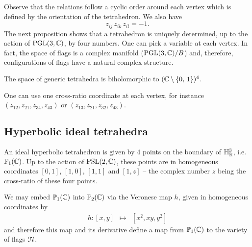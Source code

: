 Observe that the relations follow a cyclic order around each vertex which is defined by the orientation of the tetrahedron.
We also have
\begin{equation} \label{3-1}
z_{ij} \, z_{ik} \, z_{il} = -1.
\end{equation}
The next proposition shows that a tetrahedron is uniquely determined, up to the action of $\textrm{PGL}(3,\mathbb{C})$, by four numbers.
One can pick a variable at each vertex.  In fact, the space of flags  is a complex manifold ($\textrm{PGL}(3,\mathbb{C})/B$) and, therefore, configurations of flags have
a natural complex structure.
\begin{proposition}\cite{BFG}\label{parameters}
The space of generic tetrahedra is biholomorphic to $(\mathbb{C}\setminus \{0, \, 1\})^4$.
\end{proposition}

One can use one  cross-ratio coordinate at each vertex, for instance $(z_{12},z_{21},z_{34},z_{43})$ or  $(z_{13},z_{21},z_{32},z_{43})$.


\subsection{Hyperbolic ideal tetrahedra}

An ideal hyperbolic tetrahedron is given by $4$ points on the boundary of $\mathbb {\mathbb H}_{\mathbb{R}}^{3}$,
i.e. $\mathbb{P}_1(\mathbb{C})$. Up to the action of $\mathrm{PSL}(2,\mathbb{C})$, these points are in homogeneous coordinates
 $[0,1]$, $[1,0]$, $[1,1]$ and $[1,z]$ -- the complex number $z$ being the cross-ratio of these four points.


 We may embed $\mathbb{P}_1(\mathbb{C})$ into  $\mathbb{P}_2(\mathbb{C})$
via the Veronese map $h$, given in homogeneous coordinates by
\begin{eqnarray*}
 h : \left[x,y\right] & \mapsto &  [x^2,xy,y^2]
\end{eqnarray*}
and therefore this map and its derivative define a map  from $\mathbb{P}_1(\mathbb{C})$ to the variety of flags $\mathcal{F}l$.


